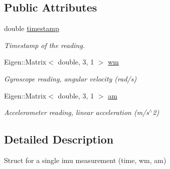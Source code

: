 \subsection*{Public Attributes}
\begin{DoxyCompactItemize}
\item 
\mbox{\label{structov__core_1_1ImuData_a530e14b091b762a7690a2acf5c826929}} 
double \hyperlink{structov__core_1_1ImuData_a530e14b091b762a7690a2acf5c826929}{timestamp}
\begin{DoxyCompactList}\small\item\em Timestamp of the reading. \end{DoxyCompactList}\item 
\mbox{\label{structov__core_1_1ImuData_aee11312b7789dd0465dded1174eb6cf3}} 
Eigen\+::\+Matrix$<$ double, 3, 1 $>$ \hyperlink{structov__core_1_1ImuData_aee11312b7789dd0465dded1174eb6cf3}{wm}
\begin{DoxyCompactList}\small\item\em Gyroscope reading, angular velocity (rad/s) \end{DoxyCompactList}\item 
\mbox{\label{structov__core_1_1ImuData_a6053ffa1918f271ac0342647df25c5f4}} 
Eigen\+::\+Matrix$<$ double, 3, 1 $>$ \hyperlink{structov__core_1_1ImuData_a6053ffa1918f271ac0342647df25c5f4}{am}
\begin{DoxyCompactList}\small\item\em Accelerometer reading, linear acceleration (m/s$^\wedge$2) \end{DoxyCompactList}\end{DoxyCompactItemize}


\subsection{Detailed Description}
Struct for a single imu measurement (time, wm, am) 